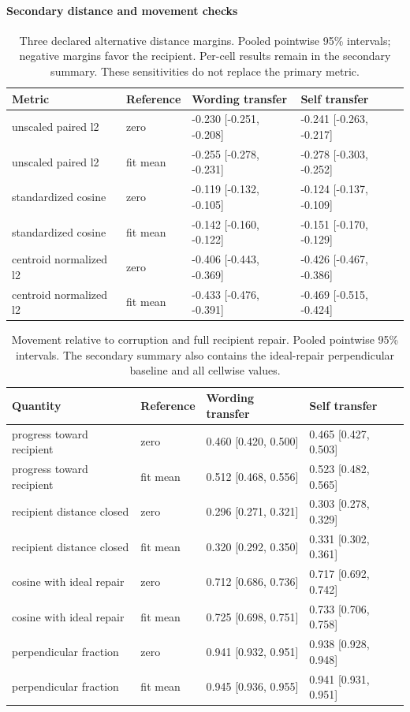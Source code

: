 \paragraph{Secondary distance and movement checks}

\begin{table}[htbp]
\centering\footnotesize
\caption{Three declared alternative distance margins. Pooled pointwise 95\% intervals; negative margins favor the recipient. Per-cell results remain in the secondary summary. These sensitivities do not replace the primary metric.}
\label{tab:b007-alternative-distances}
\begin{tabularx}{\linewidth}{@{}YYYY@{}}
\toprule
Metric & Reference & Wording transfer & Self transfer \\
\midrule
unscaled paired l2 & zero & -0.230 [-0.251, -0.208] & -0.241 [-0.263, -0.217] \\
unscaled paired l2 & fit mean & -0.255 [-0.278, -0.231] & -0.278 [-0.303, -0.252] \\
standardized cosine & zero & -0.119 [-0.132, -0.105] & -0.124 [-0.137, -0.109] \\
standardized cosine & fit mean & -0.142 [-0.160, -0.122] & -0.151 [-0.170, -0.129] \\
centroid normalized l2 & zero & -0.406 [-0.443, -0.369] & -0.426 [-0.467, -0.386] \\
centroid normalized l2 & fit mean & -0.433 [-0.476, -0.391] & -0.469 [-0.515, -0.424] \\
\bottomrule
\end{tabularx}
\end{table}

\begin{table}[htbp]
\centering\footnotesize
\caption{Movement relative to corruption and full recipient repair. Pooled pointwise 95\% intervals. The secondary summary also contains the ideal-repair perpendicular baseline and all cellwise values.}
\label{tab:b007-movement}
\begin{tabularx}{\linewidth}{@{}YYYY@{}}
\toprule
Quantity & Reference & Wording transfer & Self transfer \\
\midrule
progress toward recipient & zero & 0.460 [0.420, 0.500] & 0.465 [0.427, 0.503] \\
progress toward recipient & fit mean & 0.512 [0.468, 0.556] & 0.523 [0.482, 0.565] \\
recipient distance closed & zero & 0.296 [0.271, 0.321] & 0.303 [0.278, 0.329] \\
recipient distance closed & fit mean & 0.320 [0.292, 0.350] & 0.331 [0.302, 0.361] \\
cosine with ideal repair & zero & 0.712 [0.686, 0.736] & 0.717 [0.692, 0.742] \\
cosine with ideal repair & fit mean & 0.725 [0.698, 0.751] & 0.733 [0.706, 0.758] \\
perpendicular fraction & zero & 0.941 [0.932, 0.951] & 0.938 [0.928, 0.948] \\
perpendicular fraction & fit mean & 0.945 [0.936, 0.955] & 0.941 [0.931, 0.951] \\
\bottomrule
\end{tabularx}
\end{table}

